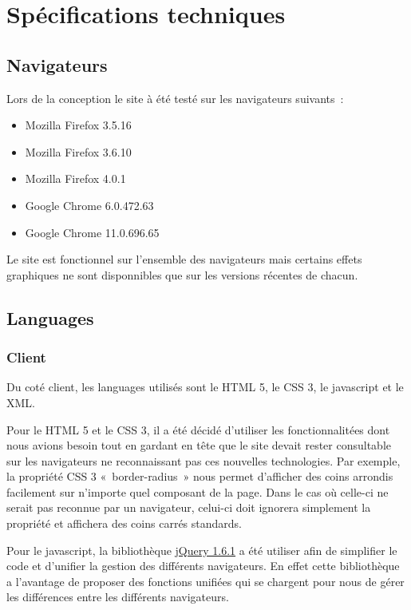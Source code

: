 \documentclass[letter, 10pt]{report}
\begin{document}
\section{Spécifications techniques}

\subsection{Navigateurs}
Lors de la conception le site à été testé sur les navigateurs suivants~:

\begin{itemize}
\item Mozilla Firefox 3.5.16
\item Mozilla Firefox 3.6.10
\item Mozilla Firefox 4.0.1
\item Google Chrome 6.0.472.63
\item Google Chrome 11.0.696.65
\end{itemize}

Le site est fonctionnel sur l'ensemble des navigateurs mais certains effets graphiques ne sont disponnibles que sur les versions récentes de chacun.

\subsection{Languages}
\subsubsection{Client}
Du coté client, les languages utilisés sont le HTML 5, le CSS 3, le javascript et le XML.

Pour le HTML 5 et le CSS 3, il a été décidé d'utiliser les fonctionnalitées dont nous avions besoin tout en gardant en tête que le site devait rester consultable sur les navigateurs ne reconnaissant pas ces nouvelles technologies. Par exemple, la propriété CSS 3 «~border-radius~» nous permet d'afficher des coins arrondis facilement sur n'importe quel composant de la page. Dans le cas où celle-ci ne serait pas reconnue par un navigateur, celui-ci doit ignorera simplement la propriété et affichera des coins carrés standards.

Pour le javascript, la bibliothèque \href{http://jquery.com/}{jQuery 1.6.1} a été utiliser afin de simplifier le code et d'unifier la gestion des différents navigateurs. En effet cette bibliothèque a l'avantage de proposer des fonctions unifiées qui se chargent pour nous de gérer les différences entre les différents navigateurs.
\end{document}

